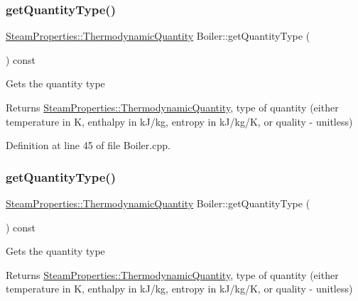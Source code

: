 \mbox{\label{class_boiler_a26a71f789c9f9e05bd43a1ca0219f920}} 
\subsubsection{\texorpdfstring{get\+Quantity\+Type()}{getQuantityType()}\hspace{0.1cm}{\footnotesize\ttfamily [1/3]}}
{\footnotesize\ttfamily \hyperlink{class_steam_properties_ae0294bedf7d178c2d8fb6aed0f62fbff}{Steam\+Properties\+::\+Thermodynamic\+Quantity} Boiler\+::get\+Quantity\+Type (\begin{DoxyParamCaption}{ }\end{DoxyParamCaption}) const}

Gets the quantity type \begin{DoxyReturn}{Returns}
\hyperlink{class_steam_properties_ae0294bedf7d178c2d8fb6aed0f62fbff}{Steam\+Properties\+::\+Thermodynamic\+Quantity}, type of quantity (either temperature in K, enthalpy in k\+J/kg, entropy in k\+J/kg/K, or quality -\/ unitless) 
\end{DoxyReturn}


Definition at line 45 of file Boiler.\+cpp.

\mbox{\label{class_boiler_a26a71f789c9f9e05bd43a1ca0219f920}} 
\subsubsection{\texorpdfstring{get\+Quantity\+Type()}{getQuantityType()}\hspace{0.1cm}{\footnotesize\ttfamily [2/3]}}
{\footnotesize\ttfamily \hyperlink{class_steam_properties_ae0294bedf7d178c2d8fb6aed0f62fbff}{Steam\+Properties\+::\+Thermodynamic\+Quantity} Boiler\+::get\+Quantity\+Type (\begin{DoxyParamCaption}{ }\end{DoxyParamCaption}) const}

Gets the quantity type \begin{DoxyReturn}{Returns}
\hyperlink{class_steam_properties_ae0294bedf7d178c2d8fb6aed0f62fbff}{Steam\+Properties\+::\+Thermodynamic\+Quantity}, type of quantity (either temperature in K, enthalpy in k\+J/kg, entropy in k\+J/kg/K, or quality -\/ unitless) 
\end{DoxyReturn}
\mbox{\label{class_boiler_a26a71f789c9f9e05bd43a1ca0219f920}} 

